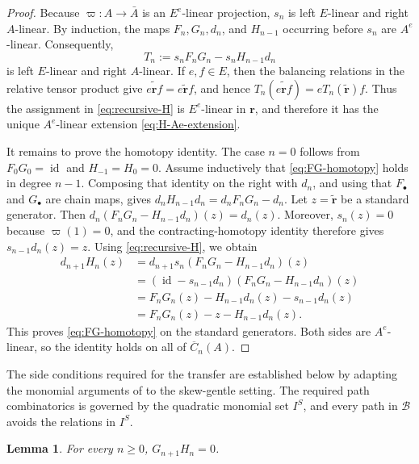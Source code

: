 \documentclass[11pt,a4paper,reqno]{amsart}
\newcommand{\mB}{\mathcal B}
\newcommand{\id}{\operatorname{id}}
\theoremstyle{plain}
\newtheorem{lemma}[lemma]{Lemma}
\theoremstyle{definition}
\numberwithin{equation}{section}
\begin{document}
	\begin{proof}
		Because $\varpi:A\to\bar A$ is an $E^e$-linear projection, $s_n$ is left
		$E$-linear and right $A$-linear.  By induction, the maps
		$F_n,G_n,d_n$, and $H_{n-1}$ occurring before $s_n$ are $A^e$-linear.
		Consequently,
		\[T_n:=s_nF_nG_n-s_nH_{n-1}d_n\]
		is left $E$-linear and right $A$-linear.  If $e,f\in E$, then the balancing
		relations in the relative tensor product give
		$\widetilde{e\mathbf r f} = e \widetilde{\mathbf r} f$,
		and hence
		$T_n(\widetilde{e\mathbf r f}) = e T_n(\widetilde{\mathbf r}) f$.
		Thus the assignment in \eqref{eq:recursive-H} is $E^e$-linear in
		$\mathbf r$, and therefore it has the unique $A^e$-linear extension
		\eqref{eq:H-Ae-extension}.
		
		It remains to prove the homotopy identity.  The case $n=0$ follows from
		$F_0G_0=\id$ and $H_{-1}=H_0=0$.  Assume inductively that
		\eqref{eq:FG-homotopy} holds in degree $n-1$.  Composing that identity on
		the right with $d_n$, and using that $F_\bullet$ and $G_\bullet$ are chain
		maps, gives
		$d_nH_{n-1}d_n = d_nF_nG_n-d_n$.
		Let $z=\widetilde{\mathbf r}$ be a standard generator.  Then
		$d_n(F_nG_n-H_{n-1}d_n)(z)=d_n(z)$.
		Moreover, $s_n(z)=0$ because $\varpi(1)=0$, and the contracting-homotopy
		identity therefore gives
		$s_{n-1}d_n(z)=z$.
		Using \eqref{eq:recursive-H}, we obtain
		\begin{align*}
			d_{n+1}H_n(z)
			&=
			d_{n+1}s_n(F_nG_n-H_{n-1}d_n)(z)\\
			&=
			(\id-s_{n-1}d_n)
			(F_nG_n-H_{n-1}d_n)(z)\\
			&=
			F_nG_n(z)-H_{n-1}d_n(z)-s_{n-1}d_n(z)\\
			&=
			F_nG_n(z)-z-H_{n-1}d_n(z).
		\end{align*}
		This proves \eqref{eq:FG-homotopy} on the standard generators.  Both sides
		are $A^e$-linear, so the identity holds on all of $\overline C_n(A)$.
	\end{proof}
	
	The side conditions required for the transfer are established below by
	adapting the monomial arguments of \cite[Lemmas~3.5 and~3.6]{RR22}
	to the skew-gentle setting. The required path combinatorics is governed
	by the quadratic monomial set $I^S$, and every path in $\mB$
	avoids the relations in $I^S$.
	
	\begin{lemma}\label{lem:GH-zero}
		For every $n\geq0$, $G_{n+1}H_n=0$.
	\end{lemma}
	
\end{document}
